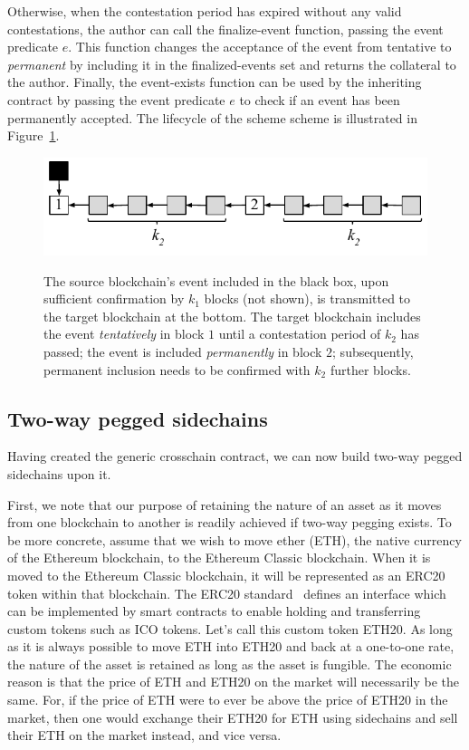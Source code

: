 Otherwise, when the contestation period has expired without any valid
contestations, the author can call the \textsf{finalize-event} function, passing
the event predicate $e$. This function changes the acceptance of the event from
tentative to \emph{permanent} by including it in the \textsf{finalized-events}
set and returns the collateral to the author. Finally, the \textsf{event-exists}
function can be used by the inheriting contract by passing the event predicate
$e$ to check if an event has been permanently accepted. The lifecycle of the
scheme scheme is illustrated in Figure~\ref{fig.contestation}.

\begin{figure}
    \caption{The source blockchain's event included in the black box, upon
             sufficient confirmation by $k_1$ blocks (not shown), is transmitted
             to the target blockchain at the bottom. The target blockchain
             includes the event \emph{tentatively} in block $1$ until a
             contestation period of $k_2$ has passed; the event is included
             \emph{permanently} in block $2$; subsequently, permanent inclusion
             needs to be confirmed with $k_2$ further blocks.}
    \centering
    \includegraphics[width=0.6 \columnwidth,keepaspectratio]{figures/contestation.pdf}
    \label{fig.contestation}
\end{figure}

\subsection*{Two-way pegged sidechains}
Having created the generic crosschain contract, we can now build two-way pegged
sidechains upon it.

First, we note that our purpose of retaining the nature of an asset as it moves
from one blockchain to another is readily achieved if two-way pegging exists. To
be more concrete, assume that we wish to move ether (ETH), the native currency
of the Ethereum blockchain, to the Ethereum Classic blockchain. When it is moved
to the Ethereum Classic blockchain, it will be represented as an ERC20 token
within that blockchain. The ERC20 standard~\cite{erc20} defines an interface
which can be implemented by smart contracts to enable holding and transferring
custom tokens such as ICO tokens. Let's call this custom token ETH20. As long as
it is always possible to move ETH into ETH20 and back at a one-to-one rate, the
nature of the asset is retained as long as the asset is fungible. The economic
reason is that the price of ETH and ETH20 on the market will necessarily be the
same. For, if the price of ETH were to ever be above the price of ETH20 in the
market, then one would exchange their ETH20 for ETH using sidechains and sell
their ETH on the market instead, and vice versa.

